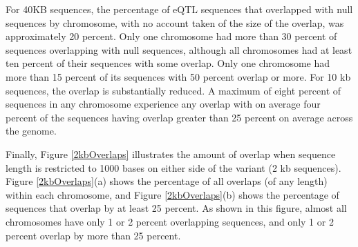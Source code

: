 \documentclass[12pt]{article}
\begin{document}
For 40KB sequences, the percentage of eQTL sequences that overlapped with null sequences by chromosome, with no account taken of the size of the overlap, 
was approximately 20 percent. Only one chromosome had more than 30 percent of sequences overlapping with null sequences, although all chromosomes had at least ten percent of their sequences with some overlap. Only one chromosome had more than 15 percent of its sequences with 50 percent overlap or more. For 10 kb sequences, the overlap is substantially reduced. A maximum of eight percent of sequences in any chromosome experience any overlap with on average 
four percent of the sequences having overlap greater than 25 percent on average across the genome.

Finally, Figure \ref{2kbOverlaps} illustrates the amount of overlap when sequence length is restricted to 1000 bases on either side of the variant (2 kb sequences). Figure \ref{2kbOverlaps}(a) shows the percentage of all overlaps (of any length) within each chromosome, and Figure \ref{2kbOverlaps}(b) shows the percentage of sequences that overlap by at least 25 percent. As shown in this figure, almost all chromosomes have only 1 or 2 percent overlapping sequences, and only 1 or 2 percent overlap by more than 25 percent.
\end{document}
